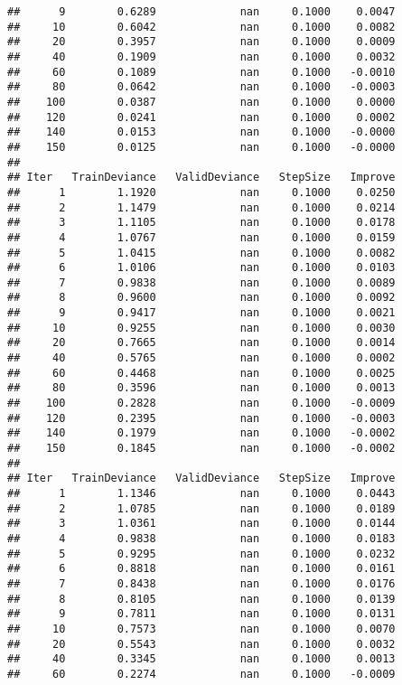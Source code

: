 \documentclass[]{article}
\begin{document}
\begin{verbatim}
##      9        0.6289             nan     0.1000    0.0047
##     10        0.6042             nan     0.1000    0.0082
##     20        0.3957             nan     0.1000    0.0009
##     40        0.1909             nan     0.1000    0.0032
##     60        0.1089             nan     0.1000   -0.0010
##     80        0.0642             nan     0.1000   -0.0003
##    100        0.0387             nan     0.1000    0.0000
##    120        0.0241             nan     0.1000    0.0002
##    140        0.0153             nan     0.1000   -0.0000
##    150        0.0125             nan     0.1000   -0.0000
## 
## Iter   TrainDeviance   ValidDeviance   StepSize   Improve
##      1        1.1920             nan     0.1000    0.0250
##      2        1.1479             nan     0.1000    0.0214
##      3        1.1105             nan     0.1000    0.0178
##      4        1.0767             nan     0.1000    0.0159
##      5        1.0415             nan     0.1000    0.0082
##      6        1.0106             nan     0.1000    0.0103
##      7        0.9838             nan     0.1000    0.0089
##      8        0.9600             nan     0.1000    0.0092
##      9        0.9417             nan     0.1000    0.0021
##     10        0.9255             nan     0.1000    0.0030
##     20        0.7665             nan     0.1000    0.0014
##     40        0.5765             nan     0.1000    0.0002
##     60        0.4468             nan     0.1000    0.0025
##     80        0.3596             nan     0.1000    0.0013
##    100        0.2828             nan     0.1000   -0.0009
##    120        0.2395             nan     0.1000   -0.0003
##    140        0.1979             nan     0.1000   -0.0002
##    150        0.1845             nan     0.1000   -0.0002
## 
## Iter   TrainDeviance   ValidDeviance   StepSize   Improve
##      1        1.1346             nan     0.1000    0.0443
##      2        1.0785             nan     0.1000    0.0189
##      3        1.0361             nan     0.1000    0.0144
##      4        0.9838             nan     0.1000    0.0183
##      5        0.9295             nan     0.1000    0.0232
##      6        0.8818             nan     0.1000    0.0161
##      7        0.8438             nan     0.1000    0.0176
##      8        0.8105             nan     0.1000    0.0139
##      9        0.7811             nan     0.1000    0.0131
##     10        0.7573             nan     0.1000    0.0070
##     20        0.5543             nan     0.1000    0.0032
##     40        0.3345             nan     0.1000    0.0013
##     60        0.2274             nan     0.1000   -0.0009

\end{verbatim}
\end{document}
